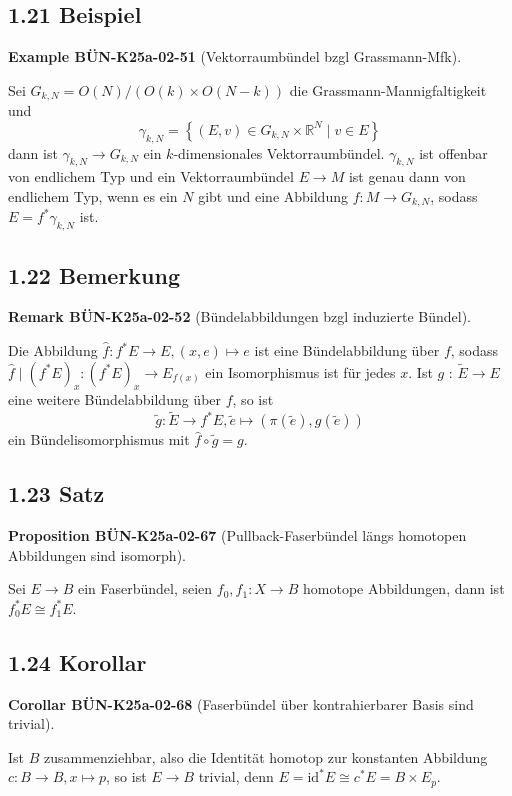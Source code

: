 \documentclass[10pt, letterpaper]{article}
\newcommand{\CustomHeading}[3]{%
  \par\medskip\noindent%
  \textbf{#1 #2} \textnormal{(#3)}.\enskip%
}
\newenvironment{PROP}[2]{\begin{unitbox}\CustomHeading{Proposition}{#1}{#2}}{\end{unitbox}}
\newenvironment{KORO}[2]{\begin{unitbox}\CustomHeading{Corollar}{#1}{#2}}{\end{unitbox}}
\newenvironment{REM}[2]{\begin{unitbox}\CustomHeading{Remark}{#1}{#2}}{\end{unitbox}}
\newenvironment{EXA}[2]{\begin{unitbox}\CustomHeading{Example}{#1}{#2}}{\end{unitbox}}
\begin{document}
\subsection*{1.21 Beispiel}
\begin{EXA}{BÜN-K25a-02-51}{Vektorraumbündel bzgl Grassmann-Mfk}
Sei $G_{k, N}=O(N) /(O(k) \times O(N-k))$ die Grassmann-Mannigfaltigkeit und
$$
\gamma_{k, N}=\left\{(E, v) \in G_{k, N} \times \mathbb{R}^{N} \mid v \in E\right\}
$$
dann ist $\gamma_{k, N} \rightarrow G_{k, N}$ ein $k$-dimensionales Vektorraumbündel. $\gamma_{k, N}$ ist offenbar von endlichem Typ und ein Vektorraumbündel $E \rightarrow M$ ist genau dann von endlichem Typ, wenn es ein $N$ gibt und eine Abbildung $f: M \rightarrow G_{k, N}$, sodass $E=f^{*} \gamma_{k, N}$ ist.
\end{EXA}

\subsection*{1.22 Bemerkung}


\begin{REM}{BÜN-K25a-02-52}{Bündelabbildungen bzgl induzierte Bündel}
Die Abbildung $\hat{f}: f^{*} E \rightarrow E,(x, e) \mapsto e$ ist eine Bündelabbildung über $f$, sodass $\hat{f} \mid\left(f^{*} E\right)_{x}:\left(f^{*} E\right)_{x} \rightarrow E_{f(x)}$ ein Isomorphismus ist für jedes $x$. Ist $g$ : $\widetilde{E} \rightarrow E$ eine weitere Bündelabbildung über $f$, so ist
$$
\tilde{g}: \widetilde{E} \rightarrow f^{*} E, \tilde{e} \mapsto(\pi(\tilde{e}), g(\tilde{e}))
$$
ein Bündelisomorphismus mit $\hat{f} \circ \tilde{g}=g$.
\end{REM}

\subsection*{1.23 Satz}

\begin{PROP}{BÜN-K25a-02-67}{Pullback-Faserbündel längs homotopen Abbildungen sind isomorph}
Sei $E \rightarrow B$ ein Faserbündel, seien $f_{0}, f_{1}: X \rightarrow B$ homotope Abbildungen, dann ist $f_{0}^{*} E \cong f_{1}^{*} E$.
\end{PROP}

\subsection*{1.24 Korollar}
\begin{KORO}{BÜN-K25a-02-68}{Faserbündel über kontrahierbarer Basis sind trivial}
Ist $B$ zusammenziehbar, also die Identität homotop zur konstanten Abbildung $c: B \rightarrow B, x \mapsto p$, so ist $E \rightarrow B$ trivial, denn $E=\mathrm{id}^{*} E \cong c^{*} E=B \times E_{p}$.
\end{KORO}
\end{document}
